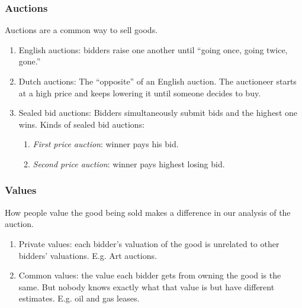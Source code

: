 \documentclass[xcolor=pdftex,dvipsnames]{beamer}
\begin{document}
\begin{frame}
  \frametitle{Auctions}
  Auctions are a common way to sell goods.
  \bigskip


  \bigskip
{}
  \begin{enumerate}
  \item<4->  English auctions:  bidders raise one another until ``going
    once, going twice, gone.'' 
  \item<5-> Dutch auctions: The ``opposite'' of an English auction. The
    auctioneer starts at a high price and keeps lowering it until
    someone decides to buy.


  \item<6-> Sealed bid auctions: Bidders simultaneously submit bids
    and the highest one wins. Kinds of sealed bid auctions:
    \begin{enumerate}
    \item<7->     \emph{First price auction}: winner pays his bid.
    \item<8-> \emph{Second price auction}: winner pays highest losing bid.
    \end{enumerate}
  \end{enumerate}
  
\end{frame}


\begin{frame}
  \frametitle{Values}
  How people value the good being sold makes a difference in our
  analysis of the auction. 

  \begin{enumerate}
  \item<2-> Private values: each bidder's valuation of the good is
    unrelated to other bidders' valuations. E.g. Art auctions.
  \item<3-> Common values: the value each bidder gets from owning the
    good is the same. But nobody knows exactly what that value
    is but have different estimates. E.g. oil and gas leases.
  \end{enumerate}
\bigskip

\end{frame}
\end{document}
